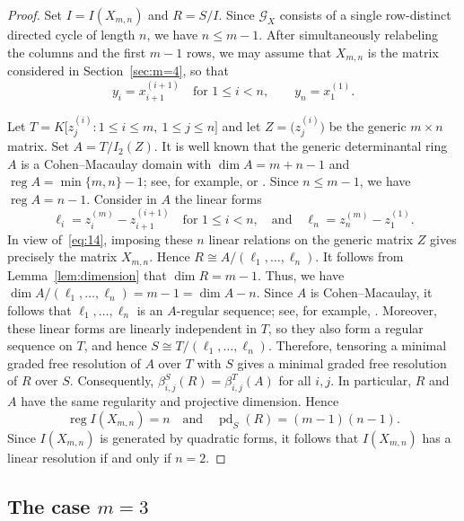 \documentclass[12pt]{amsart}
\numberwithin{equation}{section}
\begin{document}
\begin{proof}
Set $I=I(X_{m,n})$ and $R=S/I$. Since $\mathcal G_X$ consists of a single row-distinct directed
cycle of length $n$, we have $n\leq m-1$.
After simultaneously relabeling the columns and the first $m-1$
rows, we may assume that $X_{m,n}$ is the matrix considered in
Section~\ref{sec:m=4}, so that
\begin{equation}\label{eq:14}
y_i=x_{i+1}^{(i+1)}
\quad\text{for }1\leq i<n,
\qquad
y_n=x_1^{(1)}.
\end{equation}

Let $T=K\big[z_j^{(i)}:1\leq i\leq m,\ 1\leq j\leq n\big]$
and let $Z=\big(z_j^{(i)}\big)$ be the generic $m\times n$ matrix.
Set $A=T/I_2(Z)$. It is well known that the generic determinantal
ring $A$ is a Cohen--Macaulay domain with $\dim A=m+n-1$ and $\operatorname{reg} A=\min\{m,n\}-1$; see, for example,
\cite{BrunsVetter} or \cite{BrunsConcaRaicuVarbaro}.
Since $n\leq m-1$, we have $\operatorname{reg} A=n-1$.
Consider in $A$ the linear forms
\[
\ell_i=z_i^{(m)}-z_{i+1}^{(i+1)}
\quad\text{for }1\leq i<n,
\quad\text{and}\quad
\ell_n=z_n^{(m)}-z_1^{(1)}.
\]
In view of~\eqref{eq:14}, imposing these $n$ linear relations on
the generic matrix $Z$ gives precisely the matrix $X_{m,n}$. Hence $R\cong A/(\ell_1,\ldots,\ell_n).$ It follows from Lemma~\ref{lem:dimension} that $\dim R=m-1$.
Thus, we have
$\dim A/(\ell_1,\ldots,\ell_n)=m-1=\dim A-n$.
Since $A$ is Cohen--Macaulay, it follows that
$\ell_1,\ldots,\ell_n$ is an $A$-regular sequence; see, for example,
\cite[Section~2.1]{BrunsHerzog}.
Moreover, these linear forms are linearly independent in $T$,
so they also form a regular sequence on $T$, and hence
$S\cong T/(\ell_1,\ldots,\ell_n)$.
Therefore, tensoring a minimal graded free resolution of $A$
over $T$ with $S$ gives a minimal graded free resolution of $R$
over $S$. Consequently,
$\beta_{i,j}^{S}(R)=\beta_{i,j}^{T}(A)$ for all $i,j$.
In particular, $R$ and $A$ have the same regularity and
projective dimension. Hence
\[
\operatorname{reg} I(X_{m,n})=n
\quad\text{and}\quad
\operatorname{pd}_S(R)=(m-1)(n-1).
\]
Since $I(X_{m,n})$ is generated by quadratic forms,
it follows that $I(X_{m,n})$ has a linear resolution
if and only if $n=2$.
\end{proof}

\subsection{The case $m=3$}
\end{document}
